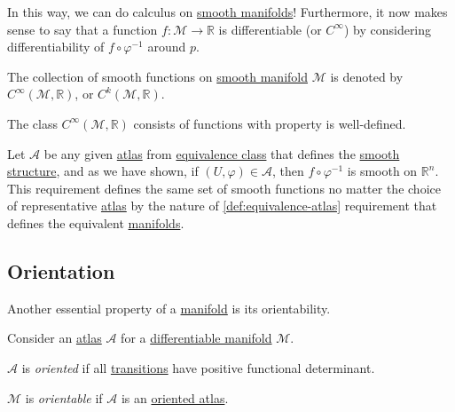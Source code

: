 In this way, we can do calculus on \hyperref[def:smooth-manifold]{smooth manifolds}! Furthermore, it now makes sense to say that a function \(f\colon \mathcal{M} \to \mathbb{R} \) is differentiable (or \(C^{\infty} \)) by considering differentiability of \(f \circ \varphi ^{-1} \) around \(p\).

\begin{notation}
	The collection of smooth functions on \hyperref[def:smooth-manifold]{smooth manifold} \(\mathcal{M} \) is denoted by \(C^{\infty} (\mathcal{M} , \mathbb{R} )\), or \(C^k(\mathcal{M} , \mathbb{R} )\).
\end{notation}

\begin{remark}
	The class \(C^{\infty} (\mathcal{M} , \mathbb{R} )\) consists of functions with property is well-defined.
\end{remark}
\begin{explanation}
	Let \(\mathcal{A} \) be any given \hyperref[def:atlas]{atlas} from \hyperref[def:equivalence-atlas]{equivalence class} that defines the \hyperref[def:smooth-structure]{smooth structure}, and as we have shown, if \((U, \varphi)\in \mathcal{A} \), then \(f \circ \varphi ^{-1} \) is smooth on \(\mathbb{R} ^n\). This requirement defines the same set of smooth functions no matter the choice of representative \hyperref[def:atlas]{atlas} by the nature of \autoref{def:equivalence-atlas} requirement that defines the equivalent \hyperref[def:smooth-manifold]{manifolds}.
\end{explanation}

\subsection{Orientation}
Another essential property of a \hyperref[def:topological-manifold]{manifold} is its orientability.

\begin{definition*}
	Consider an \hyperref[def:atlas]{atlas} \(\mathcal{A} \) for a \hyperref[def:smooth-manifold]{differentiable manifold} \(\mathcal{M} \).
	\begin{definition}[Oriented]\label{def:oriented}
		\(\mathcal{A} \) is \emph{oriented} if all \hyperref[def:coordinate-transition]{transitions} have positive functional determinant.
	\end{definition}

	\begin{definition}[Orientable]\label{def:orientable}
		\(\mathcal{M} \) is \emph{orientable} if \(\mathcal{A} \) is an \hyperref[def:oriented]{oriented atlas}.
	\end{definition}
\end{definition*}

